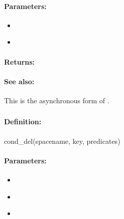 \paragraph{Parameters:}
\begin{itemize}[noitemsep]
\item {}\\

\item {}\\

\end{itemize}

\paragraph{Returns:}


\paragraph{See also:}  This is the asynchronous form of .

\pagebreak
\subsubsection{}
\label{api:ruby:cond_del}


\paragraph{Definition:}
\begin{rubycode}
cond_del(spacename, key, predicates)
\end{rubycode}

\paragraph{Parameters:}
\begin{itemize}[noitemsep]
\item {}\\

\item {}\\

\item {}\\

\end{itemize}

